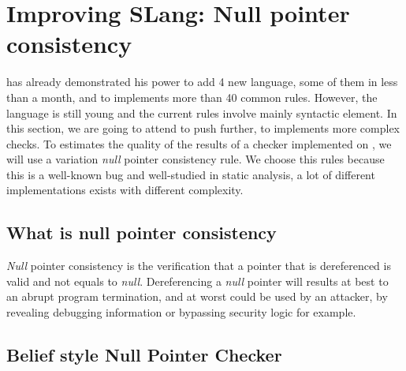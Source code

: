 \section{Improving SLang: Null pointer consistency}
\label{sec:improving_slang}

\slang{} has already demonstrated his power to add 4 new language, some of them in less than a month, and to implements more than 40 common rules. 
However, the language is still young and the current rules involve mainly syntactic element. 
In this section, we are going to attend to push \slang{} further, to implements more complex checks.
To estimates the quality of the results of a checker implemented on \slang{}, we will use a variation \emph{null} pointer consistency rule. 
We choose this rules because this is a well-known bug and well-studied in static analysis, a lot of different implementations exists with different complexity.

\subsection{What is null pointer consistency}
\label{subsec:null_pointer_consistency}

\emph{Null} pointer consistency is the verification that a pointer that is dereferenced is valid and not equals to \emph{null}. Dereferencing a \emph{null} pointer will results at best to an abrupt program termination, and at worst could be used by an attacker, by revealing debugging information or bypassing security logic for example.

\subsection{Belief style Null Pointer Checker}
\label{subsec:belief_style}

